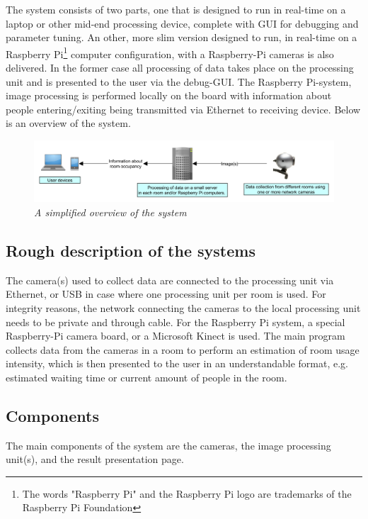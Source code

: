 The system consists of two parts, one that is designed to run in real-time on a laptop or other mid-end processing device, complete with GUI for debugging and parameter tuning. An other, more slim version designed to run, in real-time on a Raspberry Pi\footnote{The words "Raspberry Pi" and the Raspberry Pi logo are trademarks of the Raspberry Pi Foundation} computer configuration, with a Raspberry-Pi cameras is also delivered. In the former case all processing of data takes place on the processing unit and is presented to the user via the debug-GUI. The Raspberry Pi-system, image processing is performed locally on the board with information about people entering/exiting being transmitted via Ethernet to receiving device. Below is an overview of the system.

\vspace{0.5cm}
\begin{figure}[htb]
	\centering
	\includegraphics[width=170mm]{images/system_overview.png}
	\caption[System overview]{\textit{A simplified overview of the system}}
	\label{fig:block_overview2_fig}  %
\end{figure}

\subsection{Rough description of the systems}
The camera(s) used to collect data are connected to the processing unit via Ethernet, or USB in case where one processing unit per room is used. For integrity reasons, the network connecting the cameras to the local processing unit needs to be private and through cable. For the Raspberry Pi system, a special Raspberry-Pi camera board, or a Microsoft Kinect is used. The main program collects data from the cameras in a room to perform an estimation of room usage intensity, which is then presented to the user in an understandable format, e.g. estimated waiting time or current amount of people in the room.
\newpage
\subsection{Components}
The main components of the system are the cameras, the image processing unit(s), and the result presentation page.

